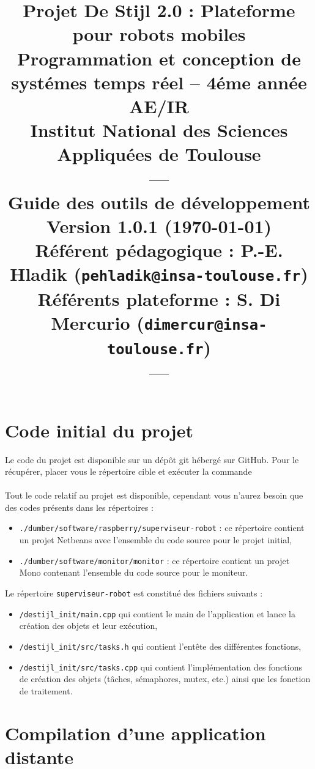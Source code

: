 \documentclass[11pt]{paper}
\title{{\Huge Projet De Stijl 2.0}
{\small : Plateforme pour robots mobiles}\\
{\scriptsize Programmation et conception de systémes temps réel -- 4éme année AE/IR}\\
{\scriptsize Institut National des Sciences Appliquées de Toulouse}\\
---\\
Guide des outils de développement \\
{\large Version 1.0.1 (\today)}\\
{\scriptsize Référent pédagogique : P.-E. Hladik (\texttt{pehladik@insa-toulouse.fr})}\\
{\scriptsize Référents plateforme : S. Di Mercurio (\texttt{dimercur@insa-toulouse.fr})}\\
---
}
\begin{document}
\maketitle

\section{Code initial du projet}
\label{sec:git}

Le code du projet est disponible sur un dépôt git hébergé sur GitHub. Pour le récupérer, placer vous le répertoire cible et exécuter la commande\\ \indent{}\\

Tout le code relatif au projet est disponible, cependant vous n'aurez besoin que des codes présents dans les répertoires :
\begin{itemize}
	\item {\tt ./dumber/software/raspberry/superviseur-robot} : ce répertoire contient un projet Netbeans avec l'ensemble du code source pour le projet initial,
	\item {\tt ./dumber/software/monitor/monitor} : ce répertoire contient un projet Mono contenant l'ensemble du code source pour le moniteur.\\
\end{itemize}

Le répertoire {\tt superviseur-robot} est constitué des fichiers suivants :
\begin{itemize}
\item {\tt /destijl\_init/main.cpp} qui contient le main de l'application et lance la création des objets et leur exécution,
\item {\tt /destijl\_init/src/tasks.h} qui contient l'entête des différentes fonctions,
\item {\tt /destijl\_init/src/tasks.cpp} qui contient l'implémentation des fonctions de création des objets (tâches, sémaphores, mutex, etc.) ainsi que les fonction de traitement.
\end{itemize}




\section{Compilation d'une application distante}
\end{document}
